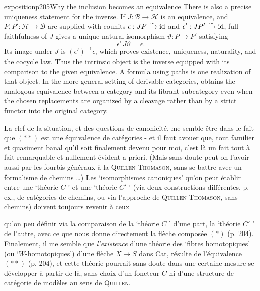 \begin{dcomment}{exposition}{p205}{Why the inclusion becomes an equivalence}
There is also a precise uniqueness statement for the inverse. If $J:\mathcal B\to\mathcal H$ is an equivalence, and $P,P':\mathcal H\to\mathcal B$ are supplied with counits $\epsilon:JP\xrightarrow{\sim}\mathrm{id}$ and $\epsilon':JP'\xrightarrow{\sim}\mathrm{id}$, full faithfulness of $J$ gives a unique natural isomorphism $\vartheta:P\to P'$ satisfying
\[
 \epsilon'\,J\vartheta=\epsilon.
\]
Its image under $J$ is $(\epsilon')^{-1}\epsilon$, which proves existence, uniqueness, naturality, and the cocycle law. Thus the intrinsic object is the inverse equipped with its comparison to the given equivalence. A formula using paths is one realization of that object. In the more general setting of derivable categories, \citet[Proposition~1.8]{Cisinski2010} obtains the analogous equivalence between a category and its fibrant subcategory even when the chosen replacements are organized by a cleavage rather than by a strict functor into the original category.
\end{dcomment}


{\reversemarginpar\marginnote{$\|$}}%
La clef de la situation, et des questions de canonicité, me semble être dans le fait que $(**)$ est une équivalence de catégories - et il faut avouer que, tout familier et quasiment banal qu'il soit finalement devenu pour moi, c'est là un fait tout à fait remarquable et nullement évident a priori. (Mais sans doute peut-on l'avoir aussi par les fourbis généraux à la \textsc{Quillen-Thomason}, sans se battre avec un formalisme de chemins \dots) Les ‘isomorphismes canoniques’ qu'on peut établir entre une ‘théorie $C$ ’ et une ‘théorie $C'$ ’ (via deux constructions différentes, p. ex., de catégories de chemins, ou via l'approche de \textsc{Quillen-Thomason}, sans chemins) doivent toujours revenir à ceux

qu'on peu définir via la comparaison de la ‘théorie $C$ ’ d'une part, la ‘théorie $C'$ ’ de l'autre, avec ce que nous donne directement la flèche composée $(*)$ (p. 204). Finalement, il me semble que \textit{l'existence} d'une théorie des ‘fibres homotopiques’ (ou ‘$W$-homotopiques’) d'une flèche $X \longrightarrow S$ dans Cat, résulte de l'équivalence $(**)$ (p. 204), et cette théorie pourrait sans doute dans une certaine mesure se développer à partir de là, sans choix d'un foncteur $C$ ni d'une structure de catégorie de modèles au sens de \textsc{Quillen}. %


